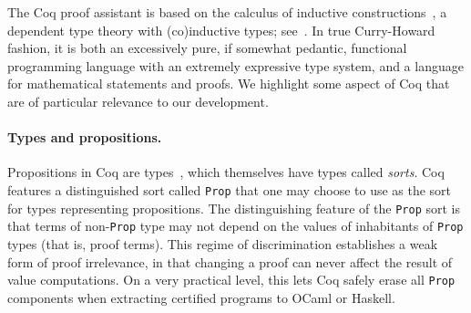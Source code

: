\documentclass[a4paper,10pt,runningheads]{llncs}
\begin{document}

The Coq proof assistant is based on the calculus of inductive
constructions~\cite{CoquandHuet,CoquandPaulin}, a dependent type theory with (co)inductive types; see~\cite{BC04,Coq}. In true Curry-Howard fashion, it is both an excessively pure, if somewhat pedantic, functional programming language with an extremely expressive type system, and a language for mathematical statements and proofs. We highlight some aspect of Coq that are of particular relevance to our development.

\paragraph{Types and propositions.}

Propositions in Coq are types~\cite{CMCP,ITT}, which themselves have types called \emph{sorts}. Coq features a distinguished sort called \lstinline|Prop| that one may choose to use as the sort for types representing propositions. The distinguishing feature of the \lstinline|Prop| sort is that terms of non-\lstinline|Prop| type may not depend on the values of inhabitants of \lstinline|Prop| types (that is, proof terms).
This regime of discrimination establishes a weak form of proof irrelevance, in that changing a proof can never affect the result of value computations. On a very practical level, this lets Coq safely erase all \lstinline|Prop| components when extracting certified programs to OCaml or Haskell.


\end{document}
